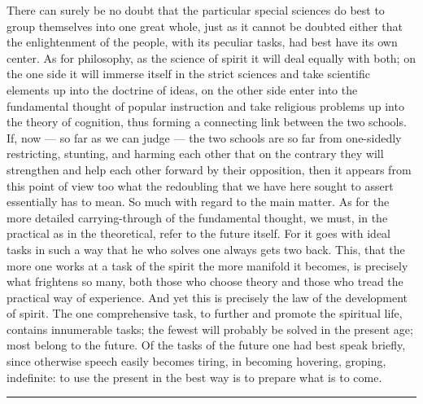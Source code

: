 \documentclass[12pt]{book}
\newcommand{\opage}[1]{\marginnote{\footnotesize\textit{[#1]}}}
\begin{document}
There can surely be no doubt that the particular special sciences do best
to group themselves into one great whole, just as it cannot be doubted
either that the enlightenment of the people, with its peculiar tasks,
had best have its own center. As for philosophy, as the science of spirit
it will deal equally with both; on the one side it will immerse itself in
the strict sciences and take scientific elements up into the doctrine of
ideas, on the other side enter into the fundamental thought of popular
instruction and take religious problems up into the theory of cognition,
thus forming a connecting link between the two schools. If, now --- so far
as we can judge --- the two schools are so far from one-sidedly
restricting, stunting, and harming each other that on the contrary they
will strengthen and help each other forward by their opposition, then it
appears from this point of view too what the redoubling that we have here
sought to assert essentially has to mean. So much with regard
\opage{294}\setcounter{footnote}{0}%
to the main matter. As for the more detailed carrying-through of the
fundamental thought, we must, in the practical as in the theoretical,
refer to the future itself. For it goes with ideal tasks in such a way
that he who solves one always gets two back. This, that the more one
works at a task of the spirit the more manifold it becomes, is precisely
what frightens so many, both those who choose theory and those who tread
the practical way of experience. And yet this is precisely the law of the
development of spirit. The one comprehensive task, to further and promote
the spiritual life, contains innumerable tasks; the fewest will probably
be solved in the present age; most belong to the future. Of the tasks of
the future one had best speak briefly, since otherwise speech easily
becomes tiring, in becoming hovering, groping, indefinite: to use the
present in the best way is to prepare what is to come.

\begin{center}\rule{3cm}{0.4pt}\end{center}
\end{document}
